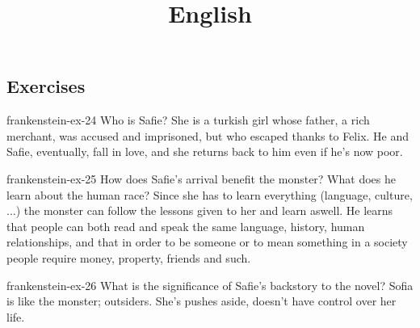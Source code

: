\documentclass[preview]{standalone}
\begin{document}
\title{English}
\genpage

\subsection{Exercises}

\begin{snippetexercise}{frankenstein-ex-24}
    {Who is Safie?}
    She is a turkish girl whose father, a rich merchant, was accused and
    imprisoned, but who escaped thanks to Felix.
    He and Safie, eventually, fall in love, 
    and she returns back to him even if he's now poor.
\end{snippetexercise}

\begin{snippetexercise}{frankenstein-ex-25}
    {How does Safie's arrival benefit the monster? What does he learn about the human race?}
    Since she has to learn everything (language, culture, ...)
    the monster can follow the lessons given to her and learn aswell.
    He learns that people can both read and speak the same language,
    history, human relationships,
    and that in order to be someone or to mean something in a society
    people require money, property, friends and such.
\end{snippetexercise}

\begin{snippetexercise}{frankenstein-ex-26}
    {What is the significance of Safie's backstory to the novel?}
    Sofia is like the monster; outsiders.
    She's pushes aside, doesn't have control over her life.
\end{snippetexercise}
\end{document}
